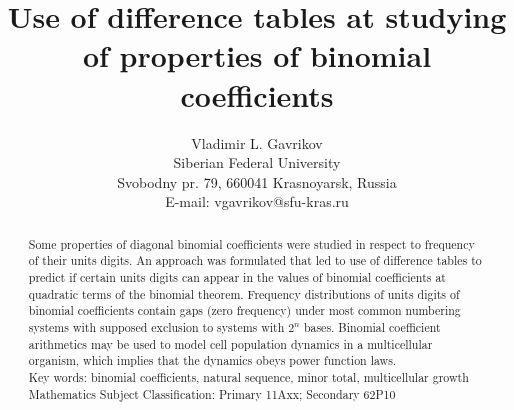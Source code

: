 \documentclass[12pt, twoside, leqno]{article}
\theoremstyle{definition}
\numberwithin{equation}{section}
\begin{document}

\baselineskip=17pt



\title{Use of difference tables at studying of properties of binomial coefficients}


\author{Vladimir L. Gavrikov\\
Siberian Federal University\\ 
Svobodny pr. 79, 660041 Krasnoyarsk, Russia\\
E-mail: vgavrikov@sfu-kras.ru}

\date{}

\maketitle

\begin{abstract}
Some properties of diagonal binomial coefficients were studied in respect to frequency of their units digits. An approach was formulated that led to use of difference tables to predict if certain units digits can appear in the values of binomial coefficients at quadratic terms of the binomial theorem. Frequency distributions of units digits of binomial coefficients contain gaps (zero frequency) under most common numbering systems with supposed exclusion to systems with $2^n$ bases. Binomial coefficient arithmetics may be used to model cell population dynamics in a multicellular organism, which implies that the dynamics obeys power function laws.\\

Key words: binomial coefficients, natural sequence, minor total, multicellular growth\\

Mathematics Subject Classification: Primary 11Axx; Secondary 62P10
\end{abstract}


\end{document}
